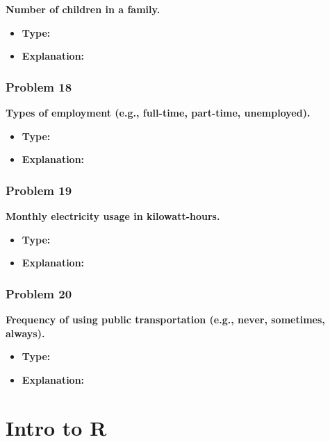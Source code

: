 \documentclass[
  letterpaper,
  DIV=11,
  numbers=noendperiod]{scrreprt}
\begin{document}
\textbf{Number of children in a family.}

\begin{itemize}
\item
  \textbf{Type:}
\item
  \textbf{Explanation:}
\end{itemize}

\subsection*{Problem 18}\label{problem-18}

\textbf{Types of employment (e.g., full-time, part-time, unemployed).}

\begin{itemize}
\item
  \textbf{Type:}
\item
  \textbf{Explanation:}
\end{itemize}

\subsection*{Problem 19}\label{problem-19}

\textbf{Monthly electricity usage in kilowatt-hours.}

\begin{itemize}
\item
  \textbf{Type:}
\item
  \textbf{Explanation:}
\end{itemize}

\subsection*{Problem 20}\label{problem-20}

\textbf{Frequency of using public transportation (e.g., never,
sometimes, always).}

\begin{itemize}
\item
  \textbf{Type:}
\item
  \textbf{Explanation:}
\end{itemize}


\chapter*{Intro to R}\label{intro-to-r}
\end{document}

